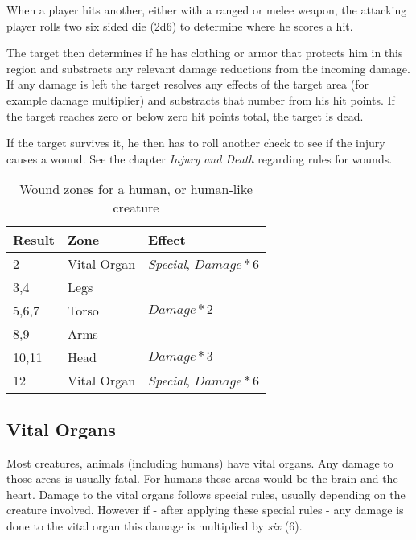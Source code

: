 When a player hits another, either with a ranged or melee weapon, the attacking
player rolls two six sided die (2d6) to determine where he scores a hit.

The target then determines if he has clothing or armor that protects him in this
region and substracts any relevant damage reductions from the incoming damage.
If any damage is left the target resolves any effects of the target area (for
example damage multiplier) and substracts that number from his hit points. If
the target reaches zero or below zero hit points total, the target is dead.

If the target survives it, he then has to roll another check to see if the
injury causes a wound. See the chapter \emph{Injury and Death} regarding rules
for wounds.

\begin{table}
  \caption{Wound zones for a human, or human-like creature}
  \begin{center}
    \begin{tabular}{|l|l|l|}
      \hline
      Result& Zone         & Effect                          \\ \hline
      2     & Vital Organ  & \emph{Special}, \(Damage * 6\)  \\ \hline
      3,4   & Legs         &                                 \\ \hline
      5,6,7 & Torso        & \(Damage * 2\)                  \\ \hline
      8,9   & Arms         &                                 \\ \hline
      10,11 & Head         & \(Damage * 3\)                  \\ \hline
      12    & Vital Organ  & \emph{Special}, \(Damage * 6\)  \\ \hline
      \hline
    \end{tabular}
  \end{center}
\end{table}

\subsection{Vital Organs}
\label{sub:7-Vital Organs}

Most creatures, animals (including humans) have vital organs. Any damage
to those areas is usually fatal. For humans these areas would be the brain
and the heart. Damage to the vital organs follows special rules, usually
depending on the creature involved. However if - after applying these special
rules - any damage is done to the vital organ this damage is multiplied by
\emph{six} (6).

